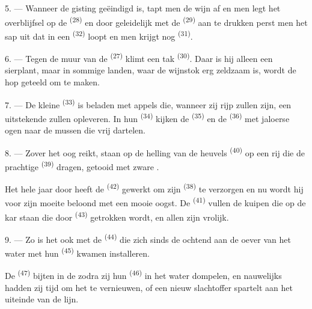 5. --- Wanneer de gisting geëindigd is, tapt men de wijn af en men legt het overblijfsel op de
 \textsuperscript{(28)} en door geleidelijk met de 
\textsuperscript{(29)} aan te drukken perst men het sap uit dat in een 
\textsuperscript{(32)} loopt en men krijgt nog  \textsuperscript{(31)}.

\VUsaut{6.0mm}
\VUsaut{3.4mm}

6. --- Tegen de muur van de  \textsuperscript{(27)} klimt een tak
 \textsuperscript{(30)}. Daar is hij alleen een sierplant, maar in
sommige landen, waar de wijnstok erg zeldzaam is, wordt de hop geteeld om
 te maken.

7. --- De kleine  \textsuperscript{(33)} is beladen met appels die, wanneer
zij rijp zullen zijn, een uitstekende  zullen opleveren. In hun 
\textsuperscript{(34)} kijken de
 \textsuperscript{(35)} en de 
\textsuperscript{(36)} met jaloerse ogen naar de mussen die vrij dartelen.

8. --- Zover het oog reikt, staan op de helling van de heuvels
 \textsuperscript{(40)} op een rij die de prachtige
 \textsuperscript{(39)} dragen, getooid met zware
.

Het hele jaar door heeft de  \textsuperscript{(42)} gewerkt om zijn
 \textsuperscript{(38)} te verzorgen en nu wordt hij voor zijn moeite
beloond met een mooie oogst. De  \textsuperscript{(41)} vullen de kuipen
die op de kar staan die door
 \textsuperscript{(43)} getrokken wordt, en allen zijn vrolijk.

\VUsaut{5.0mm}
\VUsaut{3.4mm}

9. --- Zo is het ook met de  \textsuperscript{(44)} die zich sinds de
ochtend aan de oever van het water met hun  \textsuperscript{(45)} kwamen
installeren.

De  \textsuperscript{(47)} bijten in de  zodra zij hun
 \textsuperscript{(46)} in het water dompelen, en nauwelijks hadden zij tijd om
het  te vernieuwen, of een nieuw slachtoffer spartelt aan het uiteinde van de
lijn.

